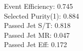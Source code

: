 Event Efficiency:   0.745\\ 
Selected Purity(1): 0.884\\ 
Passed Jet S/T:     0.818\\ 
Passed Jet MR:      0.047\\ 
Passed Jet Eff:     0.172